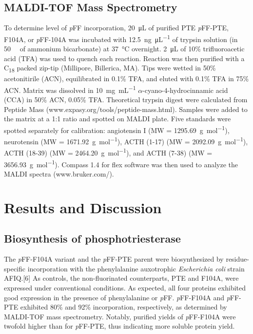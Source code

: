 \begin{refsection}
\subsection{MALDI-TOF Mass Spectrometry}

To determine level of \emph{p}FF incorporation, \SI{20}{\micro\liter} of
purified PTE \emph{p}FF-PTE, F104A, or \emph{p}FF-104A was incubated with
\SI{12.5}{\ng\per\uL} of trypsin solution (in \SI{50}{\milli\Molar} of ammonium bicarbonate) at
\SI{37}{\celsius} overnight. \SI{2}{\uL} of 10\% trifluoroacetic acid (TFA) was used
to quench each reaction. Reaction was then purified with a C\textsubscript{18}
packed zip-tip (Millipore, Billerica, MA).  Tips were wetted in 50\%
acetonitirile (ACN), equilibrated in 0.1\% TFA, and eluted with 0.1\% TFA in
75\% ACN. Matrix was dissolved in \SI{10}{\mg\per\mL} $\alpha$-cyano-4-hydrocinnamic acid
(CCA) in 50\% ACN, 0.05\% TFA. Theoretical trypsin digest were calculated from
Peptide Mass (www.expasy.org/tools/peptide-mass.html). Samples were added to
the matrix at a 1:1 ratio and spotted on MALDI plate. Five standards were
spotted separately for calibration: angiotensin I (MW =
\SI{1295.69}{\g\per\mole}), neurotensin (MW = \SI{1671.92}{\g\per\mole}), ACTH
(1-17) (MW = \SI{2092.09}{\g\per\mole}), ACTH (18-39) (MW =
\SI{2464.20}{\g\per\mole}), and ACTH (7-38) (MW = \SI{3656.93}{\g\per\mole}).
Compass 1.4 for flex software was then used to analyze the MALDI spectra
(www.bruker.com/).

\section{Results and Discussion}

\subsection{Biosynthesis of phosphotriesterase}

The \emph{p}FF-F104A variant and the \emph{p}FF-PTE parent were biosynthesized
by residue-specific incorporation with the phenylalanine auxotrophic
\emph{Escherichia coli} strain AFIQ.[6] As controls, the non-fluorinated
counterparts, PTE and F104A, were expressed under conventional conditions. As
expected, all four proteins exhibited good expression in the presence of
phenylalanine or \emph{p}FF. \emph{p}FF-F104A and \emph{p}FF-PTE exhibited 80\%
and 92\% incorporation, respectively, as determined by MALDI-TOF mass
spectrometry. Notably, purified yields of \emph{p}FF-F104A were twofold higher
than for \emph{p}FF-PTE, thus indicating more soluble protein yield.


\end{refsection}
